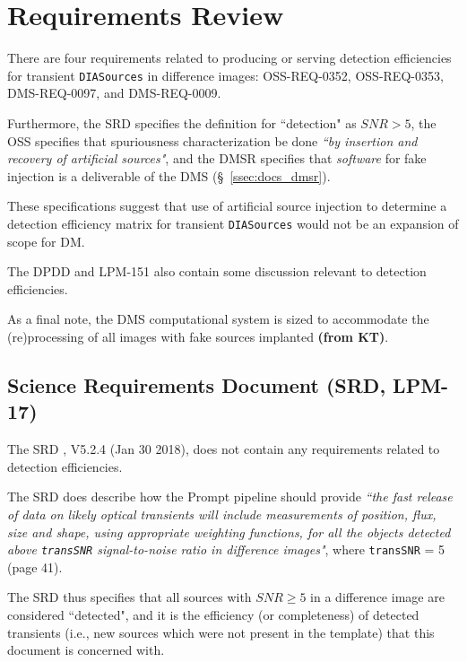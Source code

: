 \section{Requirements Review}\label{sec:docs}

There are four requirements related to producing or serving detection efficiencies for transient {\tt DIASources} in difference images: OSS-REQ-0352, OSS-REQ-0353, DMS-REQ-0097, and DMS-REQ-0009.

Furthermore, the SRD specifies the definition for ``detection" as $SNR>5$, the OSS specifies that spuriousness characterization be done {\it ``by insertion and recovery of artificial sources"}, and the DMSR specifies that {\it software} for fake injection is a deliverable of the DMS (\S~\ref{ssec:docs_dmsr}).

These specifications suggest that use of artificial source injection to determine a detection efficiency matrix for transient {\tt DIASources} would not be an expansion of scope for DM.

The DPDD and LPM-151 also contain some discussion relevant to detection efficiencies.

As a final note, the DMS computational system is sized to accommodate the (re)processing of all images with fake sources implanted {\bf (from KT)}.


\subsection{Science Requirements Document (SRD, LPM-17)}

The SRD , V5.2.4 (Jan 30 2018), does not contain any requirements related to detection efficiencies.

The SRD does describe how the Prompt pipeline should provide {\it ``the fast release of data on likely optical transients will include measurements of position, flux, size and shape, using appropriate weighting functions, for all the objects detected above {\tt transSNR} signal-to-noise ratio in difference images"}, where {\tt transSNR} = 5 (page 41).

The SRD thus specifies that all sources with $SNR \geq 5$ in a difference image are considered ``detected", and it is the efficiency (or completeness) of detected transients (i.e., new sources which were not present in the template) that this document is concerned with.


